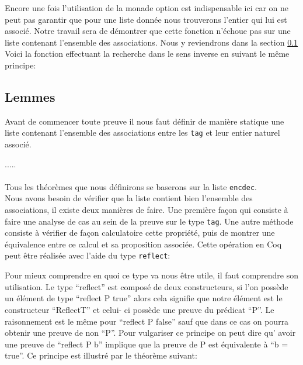 \documentclass {article}
\newcommand{\codefrom}[3]
           {}
\theoremstyle{definition}
\theoremstyle{remark}
\newcommand{\fun}[1]{\lstinline!#1!}
\begin{document}
\codefrom{src}{association_list}{lookup}

Encore une fois l'utilisation de la monade option est indispensable ici car
on ne peut pas garantir que pour une liste donnée nous trouverons l'entier
qui lui est associé. Notre travail sera de démontrer que cette fonction n'échoue pas
sur une liste contenant l'ensemble des associations. Nous y reviendrons dans la section
\ref{Lemmeslol}
Voici la fonction effectuant la recherche dans le sens inverse en suivant le même principe:

\codefrom{src}{association_list}{lookdown}



\subsection{Lemmes}
\label{Lemmeslol}

Avant de commencer toute preuve il nous faut définir de manière statique une liste
contenant l'ensemble des associations entre les \fun{tag} et leur entier naturel associé.


\codefrom{src}{association_list}{encdec}
.....\\ \\

Tous les théorèmes que nous définirons se baserons sur la liste \fun{encdec}. \\
Nous avons besoin de vérifier que la liste contient bien l'ensemble des associations,
il existe deux manières de faire. Une première façon qui consiste à faire une analyse de cas
au sein de la preuve sur le type \fun{tag}.
Une autre méthode consiste à vérifier de façon calculatoire cette propriété, puis de montrer
une équivalence entre ce calcul et sa proposition associée. 
Cette opération en Coq peut être réalisée avec l'aide du type \fun{reflect}:

\codefrom{rapport}{definitions}{reflect}

Pour mieux comprendre en quoi ce type va nous être utile, il faut comprendre son utilisation.
Le type ``reflect'' est composé de deux constructeurs, si l'on possède un élément de type
``reflect P true'' alors cela signifie que notre élément est le constructeur ``ReflectT''
et celui- ci possède une preuve du prédicat ``P''. Le raisonnement est le même pour ``reflect P false''
sauf que dans ce cas on pourra obtenir une preuve de non ``P''. Pour vulgariser ce
principe on peut dire qu' avoir une preuve de ``reflect P b'' implique que la preuve
de P est équivalente à ``b = true''. Ce principe est illustré par le théorème suivant:
\end{document}
